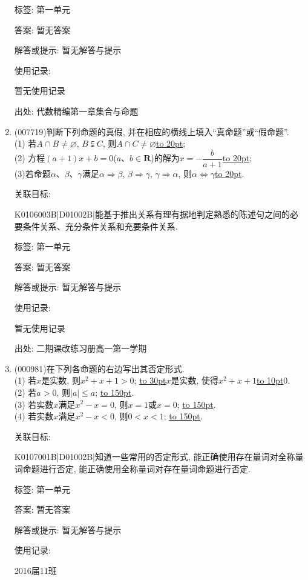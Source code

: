 \documentclass[10pt,a4paper]{article}
\newcommand{\blank}[1]{\underline{\hbox to #1pt{}}}
\begin{document}
\begin{enumerate}[1.]
标签: 第一单元

答案: 暂无答案

解答或提示: 暂无解答与提示

使用记录:

暂无使用记录


出处: 代数精编第一章集合与命题
\item { (007719)}判断下列命题的真假, 并在相应的横线上填入``真命题''或``假命题''.\\
(1) 若$A\cap B\ne \varnothing$, $B\subsetneqq C$, 则$A\cap C\ne \varnothing$\blank{20};\\
(2) 方程$(a+1)x+b=0$($a$、$b\in \mathbf{R}$)的解为$x=-\dfrac b{a+1}$\blank{20};\\
(3)若命题$\alpha$、$\beta$、$\gamma$满足$\alpha \Rightarrow \beta$, $\beta \Rightarrow \gamma$, $\gamma \Rightarrow \alpha$, 则$\alpha \Leftrightarrow \gamma$\blank{20}.


关联目标:

K0106003B|D01002B|能基于推出关系有理有据地判定熟悉的陈述句之间的必要条件关系、充分条件关系和充要条件关系.



标签: 第一单元

答案: 暂无答案

解答或提示: 暂无解答与提示

使用记录:

暂无使用记录


出处: 二期课改练习册高一第一学期
\item { (000981)}在下列各命题的右边写出其否定形式.\\ 
(1) 若$x$是实数, 则$x^2+x+1>0$; \blank{30}$x$是实数, 使得$x^2+x+1$\blank{10}$0$.\\ 
(2) 若$a>0$, 则$|a|\le a$; \blank{150}.\\ 
(3) 若实数$x$满足$x^2-x=0$, 则$x=1$或$x=0$; \blank{150}.\\ 
(4) 若实数$x$满足$x^2-x<0$, 则$0<x<1$; \blank{150}.


关联目标:

K0107001B|D01002B|知道一些常用的否定形式, 能正确使用存在量词对全称量词命题进行否定, 能正确使用全称量词对存在量词命题进行否定.



标签: 第一单元

答案: 暂无答案

解答或提示: 暂无解答与提示

使用记录:

2016届11班				


\end{enumerate}
\end{document}
